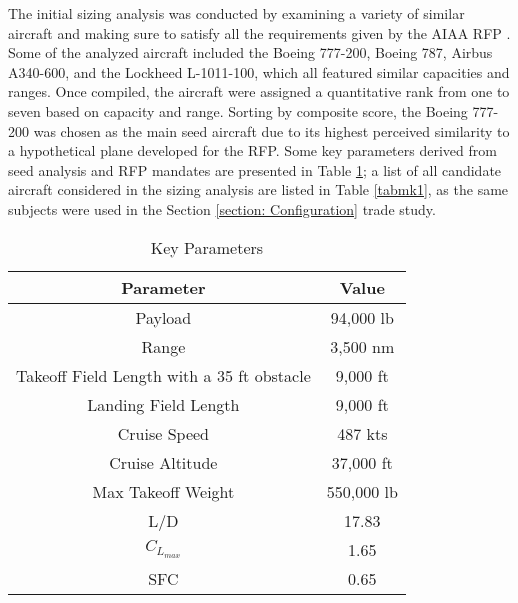 The initial sizing analysis was conducted by examining a variety of similar aircraft and making sure to satisfy all the requirements given by the AIAA RFP \cite{RFP}. Some of the analyzed aircraft included the Boeing 777-200, Boeing 787, Airbus A340-600, and the Lockheed L-1011-100, which all featured similar capacities and ranges.  Once compiled, the aircraft were assigned a quantitative rank from one to seven based on  capacity and range. Sorting by composite score, the Boeing 777-200 was chosen as the main seed aircraft due to its highest perceived similarity to a hypothetical plane developed for the RFP. Some key parameters derived from seed analysis and RFP mandates are presented in Table \ref{tab:req}; a list of all candidate aircraft considered in the sizing analysis are listed in Table \ref{tabmk1}, as the same subjects were used in the Section \ref{section: Configuration} trade study.

\begin{table}[h!] 
    \centering
    \caption{Key Parameters}
    \begin{tabular}{ |c||c| }\toprule
    \textbf{Parameter} & \textbf{Value} \\\hline\hline
    Payload & 94,000 lb  \\\hline
    Range & 3,500 nm \\\hline
    Takeoff Field Length with a 35 ft obstacle & 9,000 ft  \\\hline
    Landing Field Length & 9,000 ft \\\hline
    Cruise Speed & 487 kts\\\hline
    Cruise Altitude & 37,000 ft \\\hline
    Max Takeoff Weight & 550,000 lb\\\hline 
    L/D & 17.83\\\hline 
    $C_{L_{max}}$ & 1.65\\\hline 
    SFC & 0.65\\\hline 

    \end{tabular}\label{tab:req}
\end{table}

